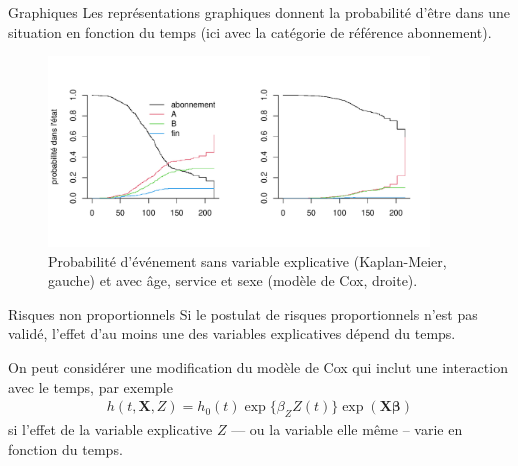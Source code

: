 \documentclass[
  ignorenonframetext,
]{beamer}
\begin{document}
\begin{frame}{Graphiques}
\protect\hypertarget{graphiques}{}
Les représentations graphiques donnent la probabilité d'être dans une
situation en fonction du temps (ici avec la catégorie de référence
abonnement).

\footnotesize

\begin{figure}

{\centering \includegraphics[width=0.9\textwidth,height=\textheight]{MATH60602-diapos10_files/figure-beamer/fig-competitif-1.pdf}

}

\caption{\label{fig-competitif}Probabilité d'événement sans variable
explicative (Kaplan-Meier, gauche) et avec âge, service et sexe (modèle
de Cox, droite).}

\end{figure}
\end{frame}

\begin{frame}{Risques non proportionnels}
\protect\hypertarget{risques-non-proportionnels}{}
Si le postulat de risques proportionnels n'est pas validé, l'effet d'au
moins une des variables explicatives dépend du temps.

On peut considérer une modification du modèle de Cox qui inclut une
interaction avec le temps, par exemple \begin{align*}
h(t,\mathbf{X}, Z) = h_0(t)\exp\{\beta_Z Z(t)\}\exp(\mathbf{X}\boldsymbol{\beta})
\end{align*} si l'effet de la variable explicative \(Z\) --- ou la
variable elle même -- varie en fonction du temps.
\end{frame}
\end{document}
